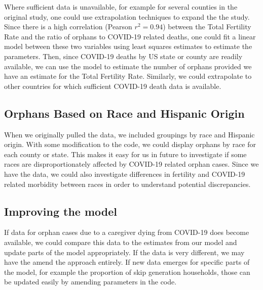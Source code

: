 \documentclass[11pt]{article}
\begin{document}
Where sufficient data is unavailable, for example for several counties in the original study, one could use extrapolation techniques to expand the the study. Since there is a high correlation (Pearson $r^2 = 0.94$) \cite{global_study} between the Total Fertility Rate and the ratio of orphans to COVID-19 related deaths, one could fit a linear model between these two variables using least squares estimates to estimate the parameters. Then, since COVID-19 deaths by US state \cite{covid_US_states} or county \cite{covid_US_counties} are readily available, we can use the model to estimate the number of orphans provided we have an estimate for the Total Fertility Rate. Similarly, we could extrapolate to other countries for which sufficient COVID-19 death data is available.

\subsection{Orphans Based on Race and Hispanic Origin}
When we originally pulled the data, we included groupings by race and Hispanic origin. With some modification to the code, we could display orphans by race for each county or state. This makes it easy for us in future to investigate if some races are disproportionately affected by COVID-19 related orphan cases. Since we have the data, we could also investigate differences in fertility and COVID-19 related morbidity between races in order to understand potential discrepancies. 

\subsection{Improving the model}
If data for orphan cases due to a caregiver dying from COVID-19 does become available, we could compare this data to the estimates from our model and update parts of the model appropriately. If the data is very different, we may have the amend the approach entirely. If new data emerges for specific parts of the model, for example the proportion of skip generation households, those can be updated easily by amending parameters in the code. 

\printbibliography 
\end{document}
